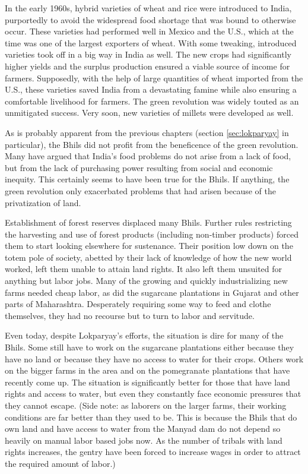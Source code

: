 \documentclass[report.tex]{subfiles}
\begin{document}
In the early 1960s, hybrid varieties of wheat and rice were introduced to India, purportedly to avoid the widespread food shortage that was bound to otherwise occur. These varieties had performed well in Mexico and the U.S., which at the time was one of the largest exporters of wheat. With some tweaking, introduced varieties took off in a big way in India as well. The new crops had significantly higher yields and the surplus production ensured a viable source of income for farmers. Supposedly, with the help of large quantities of wheat imported from the U.S., these varieties saved India from a devastating famine while also ensuring a comfortable livelihood for farmers. The green revolution was widely touted as an unmitigated success. Very soon, new varieties of millets were developed as well.

As is probably apparent from the previous chapters (section \ref{sec:lokparyay} in particular), the Bhils did not profit from the beneficence of the green revolution. Many have argued that India's food problems do not arise from a lack of food, but from the lack of purchasing power resulting from social and economic inequity. This certainly seems to have been true for the Bhils. If anything, the green revolution only exacerbated problems that had arisen because of the privatization of land.

Establishment of forest reserves displaced many Bhils. Further rules restricting the harvesting and use of forest products (including non-timber products) forced them to start looking elsewhere for sustenance. Their position low down on the totem pole of society, abetted by their lack of knowledge of how the new world worked, left them unable to attain land rights. It also left them unsuited for anything but labor jobs. Many of the growing and quickly industrializing new farms needed cheap labor, as did the sugarcane plantations in Gujarat and other parts of Maharashtra. Desperately requiring some way to feed and clothe themselves, they had no recourse but to turn to labor and servitude.

Even today, despite Lokparyay's efforts, the situation is dire for many of the Bhils. Some still have to work on the sugarcane plantations either because they have no land or because they have no access to water for their crops. Others work on the bigger farms in the area and on the pomegranate plantations that have recently come up. The situation is significantly better for those that have land rights and access to water, but even they constantly face economic pressures that they cannot escape. (Side note: as laborers on the larger farms, their working conditions are far better than they used to be. This is because the Bhils that do own land and have access to water from the Manyad dam do not depend so heavily on manual labor based jobs now. As the number of tribals with land rights increases, the gentry have been forced to increase wages in order to attract the required amount of labor.)
\end{document}

